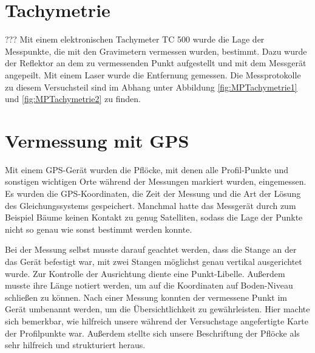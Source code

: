 \section{Tachymetrie}???
Mit einem elektronischen Tachymeter TC 500 wurde die Lage der Messpunkte, die mit den Gravimetern vermessen wurden, bestimmt. Dazu wurde der Reflektor an dem zu vermessenden Punkt aufgestellt und mit dem Messgerät angepeilt. Mit einem Laser wurde die Entfernung gemessen. Die Messprotokolle zu diesem Versuchsteil sind im Abhang unter Abbildung \ref{fig:MPTachymetrie1} und \ref{fig:MPTachymetrie2} zu finden.

\section{Vermessung mit GPS}

Mit einem GPS-Gerät wurden die Pflöcke, mit denen alle Profil-Punkte und sonstigen wichtigen Orte während der Messungen markiert wurden, eingemessen. Es wurden die GPS-Koordinaten, die Zeit der Messung und die Art der Lösung des Gleichungssystems gespeichert. Manchmal hatte das Messgerät durch zum Beispiel Bäume keinen Kontakt zu genug Satelliten, sodass die Lage der Punkte nicht so genau wie sonst bestimmt werden konnte.

Bei der Messung selbst musste darauf geachtet werden, dass die Stange an der das Gerät befestigt war, mit zwei Stangen möglichst genau vertikal ausgerichtet wurde. Zur Kontrolle der Ausrichtung diente eine Punkt-Libelle. Außerdem musste ihre Länge notiert werden, um auf die Koordinaten auf Boden-Niveau schließen zu können. Nach einer Messung konnten der vermessene Punkt im Gerät umbenannt werden, um die Übersichtlichkeit zu gewährleisten. Hier machte sich bemerkbar, wie hilfreich unsere während der Versuchstage angefertigte Karte der Profilpunkte war. Außerdem stellte sich unsere Beschriftung der Pflöcke als sehr hilfreich und strukturiert heraus.

